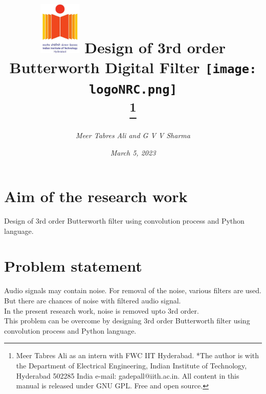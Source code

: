 \documentclass[journal,10pt,twocolumn]{article}
\begin{document}

\let\vec\mathbf


\title{{\includegraphics[width=2.0cm]{logoIITH.png}}
\hspace{1.0cm}
{Design of 3rd order Butterworth Digital Filter}
\hspace{1.0cm}
{\texttt{[image: logoNRC.png]}}\\
\thanks{Meer Tabres Ali as an intern with FWC IIT Hyderabad. *The author is with the Department of Electrical Engineering, Indian Institute of Technology, Hyderabad 502285 India e-mail: gadepall@iith.ac.in. All content in this manual is released under GNU GPL. Free and open source.}}

\author{\textit{Meer Tabres Ali and G V V Sharma}}
\date{\textit{March 5, 2023}}

\maketitle
\tableofcontents
\section{Aim of the research work}
Design of 3rd order Butterworth filter using convolution process and Python language.

\section{Problem statement}
\vspace{0.1cm}
Audio signals may contain noise. For removal of the noise, various filters are used. But there are chances of noise with filtered audio signal. \\
In the present research work, noise is removed upto 3rd order.\\
This problem can be overcome by designing 3rd order Butterworth filter using convolution process and Python language.\\
\vspace{0.2cm}
\end{document}
